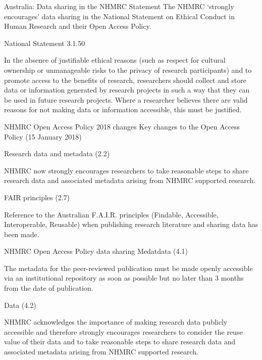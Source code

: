 \documentclass[aspectratio=169, 11pt]{beamer} %
\begin{document}
\begin{frame}{Australia: Data sharing in the NHMRC Statement}
    The NHMRC `strongly encourages' data sharing in the National Statement on Ethical Conduct in Human Research and their Open Access Policy. \cite{Nhmrc2018-sj, Nhmrc2018-vn} \par
    National Statement 3.1.50 \par
    In the absence of justifiable ethical reasons (such as respect for cultural ownership or unmanageable risks to the privacy of research participants) and to promote access to the benefits of research, researchers should collect and store data or information generated by research projects in such a way that they can be used in future research projects. Where a researcher believes there are valid reasons for not making data or information accessible, this must be justified.
\end{frame}

\begin{frame}{NHMRC Open Access Policy 2018 changes}
    Key changes to the Open Access Policy (15 January 2018) \par
    Research data and metadata (2.2) \par
    NHMRC now strongly encourages researchers to take reasonable steps to share research data and associated metadata arising from NHMRC supported research.\par
    FAIR principles (2.7) \par
    Reference to the Australian F.A.I.R. principles (Findable, Accessible, Interoperable, Reusable) when publishing research literature and sharing data has been made.
\end{frame}

\begin{frame}{NHMRC Open Access Policy data sharing}
    Medatdata (4.1) \par
    The metadata for the peer-reviewed publication must be made openly accessible via an institutional repository as soon as possible but no later than 3 months from the date of publication. \par
    Data (4.2) \par
    NHMRC acknowledges the importance of making research data publicly accessible and therefore strongly encourages researchers to consider the reuse value of their data and to take reasonable steps to share research data and associated metadata arising from NHMRC supported research.
\end{frame}
\end{document}
